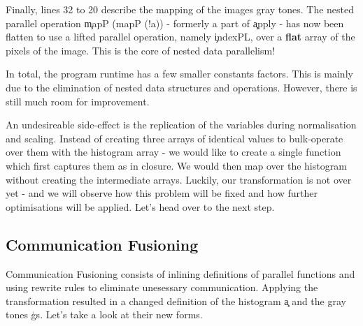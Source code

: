       
      Finally, lines 32 to 20 describe the mapping of the images gray tones.
      The nested parallel operation \c{mapP (mapP (!a))} - formerly a part of \c{apply} - 
      has now been flatten to use a lifted parallel operation, namely \c{indexPL}, over a \textbf{flat} array of
      the pixels of the image. This is the core of nested data parallelism!
      
      In total, the program runtime has a few smaller constants factors. This is mainly due to the elimination of nested data structures
      and operations. However, there is still much room for improvement.
      
      An undesireable side-effect
      is the replication of the variables during normalisation and scaling. Instead of creating three arrays of identical values
      to bulk-operate over them with the histogram array - we would like to create a single function which first
      captures them as in closure. We would then map over the histogram without creating the intermediate arrays.
      Luckily, our transformation is not over yet - and we will observe how this problem will be fixed and how further optimisations will be applied.
      Let's head over to the next step.
      
    \subsection{Communication Fusioning}
      
      Communication Fusioning consists of inlining definitions of parallel functions and using rewrite rules to eliminate
      unesessary communication. Applying the transformation resulted in a changed definition of the histogram \c{a} and the
      gray tones \c{gs}. Let's take a look at their new forms.
      

